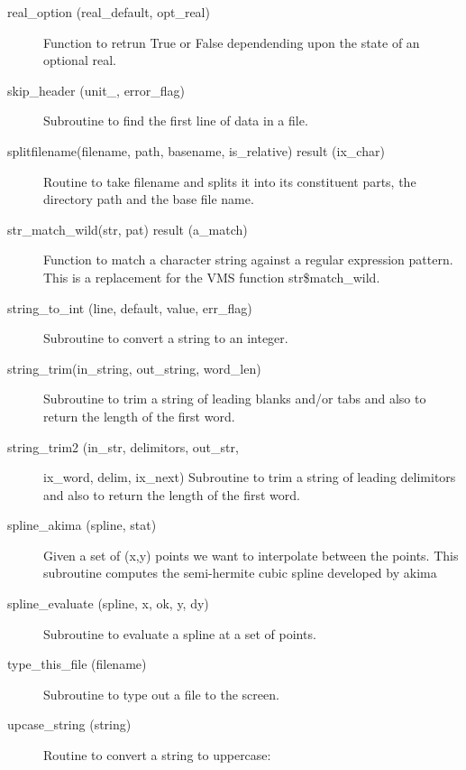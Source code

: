 \begin{description}
\item[real_option (real_default, opt_real)] \Newline 
Function to retrun True or False dependending upon the state of an 
optional real.

\item[skip_header (unit_, error_flag)] \Newline 
Subroutine to find the first line of data in a file. 

\item[splitfilename(filename, path, basename, is_relative) result (ix_char)] \Newline 
Routine to take filename and splits it into its constituent parts, 
the directory path and the base file name.  

\item[str_match_wild(str, pat) result (a_match)] \Newline 
Function to match a character string against a regular expression pattern.
This is a replacement for the VMS function str\$match_wild.

\item[string_to_int (line, default, value, err_flag)] \Newline 
Subroutine to convert a string to an integer.

\item[string_trim(in_string, out_string, word_len)] \Newline 
Subroutine to trim a string of leading blanks and/or tabs and also to return the
length of the first word.

\item[string_trim2 (in_str, delimitors, out_str,] \Newline 
                                     ix_word, delim, ix_next)
Subroutine to trim a string of leading delimitors and also to return the
length of the first word.

\item[spline_akima (spline, stat)] \Newline 
Given a set of (x,y) points we want to interpolate between the points.
This subroutine computes the semi-hermite cubic spline developed by akima

\item[spline_evaluate (spline, x, ok, y, dy)] \Newline 
Subroutine to evaluate a spline at a set of points.

\item[type_this_file (filename)] \Newline 
Subroutine to type out a file to the screen.

\item[upcase_string (string)] \Newline 
Routine to convert a string to uppercase:

\end{description}

